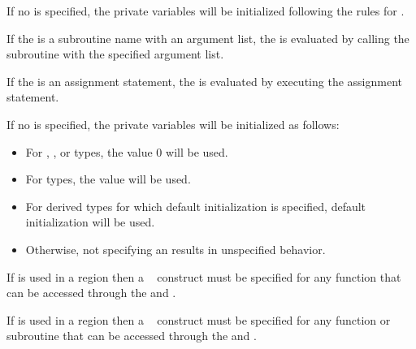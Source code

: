 \begin{cppspecific}
If no  is specified, the private variables will be initialized following the
rules for .
\end{cppspecific}

\begin{fortranspecific}
If the  is a subroutine name with an argument list, the  is
evaluated by calling the subroutine with the specified argument list.

If the  is an assignment statement, the  is evaluated by
executing the assignment statement.

If no  is specified, the private variables will be initialized as follows:
\begin{itemize}
\item For , , or  types, the value 0 will be used.
\item For  types, the value  will be used.
\item For derived types for which default initialization is specified, default initialization
will be used.
\item Otherwise, not specifying an  results in unspecified behavior.
\end{itemize}
\end{fortranspecific}

\begin{ccppspecific}
If  is used in a  region then a ~ construct
must be specified for any function that can be accessed through the  and
.
\end{ccppspecific}

\begin{fortranspecific}
If  is used in a  region then a ~ construct
must be specified for any function or subroutine that can be accessed through the 
and .
\end{fortranspecific}

